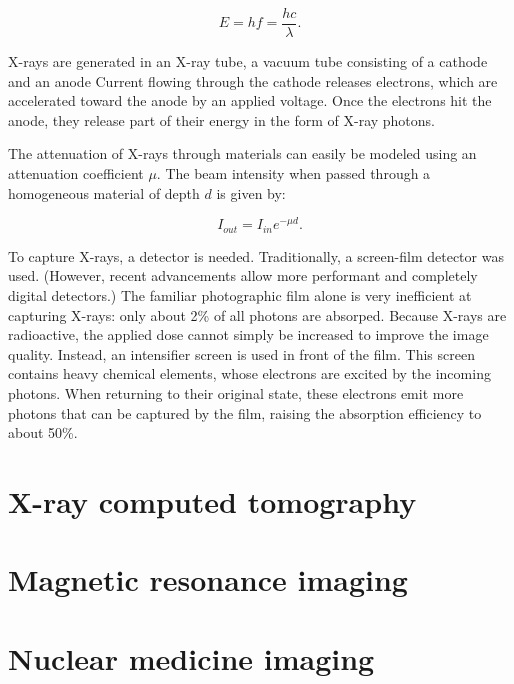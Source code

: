 \begin{equation}
	E = hf = \frac{hc}{\lambda}.
\end{equation}

X-rays are generated in an X-ray tube, a vacuum tube consisting of a cathode and
an anode Current flowing through the cathode releases electrons,
which are accelerated toward the anode by an applied voltage. Once the electrons
hit the anode, they release part of their energy in the form of X-ray photons.

The attenuation of X-rays through materials can easily be modeled using an
attenuation coefficient $\mu$. The beam intensity when passed through a
homogeneous material of depth $d$ is given by: 

\begin{equation}
	I_{out} = I_{in} e^{-\mu d}.
\end{equation}

To capture X-rays, a detector is needed. Traditionally, a screen-film detector
was used. (However, recent advancements allow more performant and completely
digital detectors.) The familiar photographic film alone is very inefficient
at capturing X-rays: only about 2\% of all photons are absorped. Because X-rays
are radioactive, the applied dose cannot simply be increased to improve the
image quality. Instead, an intensifier screen is used in front of the film. This
screen contains heavy chemical elements, whose electrons are excited by the
incoming photons. When returning to their original state, these electrons emit
more photons that can be captured by the film, raising the absorption efficiency
to about 50\%.


\section{X-ray computed tomography}

\section{Magnetic resonance imaging}

\section{Nuclear medicine imaging}

